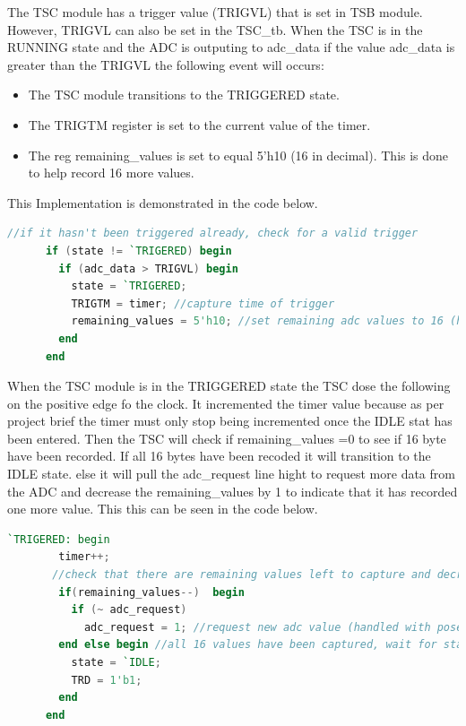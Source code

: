 The TSC module has a trigger value (TRIGVL) that is set in TSB module.
However, TRIGVL can also be set in the TSC\_tb.
When the TSC is in the RUNNING state and the ADC is outputing to adc\_data if the value adc\_data is
greater than the TRIGVL the following event will occurs:

\begin{itemize}
      \item The TSC module transitions to the TRIGGERED state.
      \item The TRIGTM register is set to the current value of the timer.
      \item  The reg remaining\_values is set to equal 5'h10 (16 in decimal). This is done to help record 16 more values.
\end{itemize}

This Implementation is demonstrated in the code below.

\begin{lstlisting}[language=Verilog, caption={Code for triggering event in the TSC module}, label={triggering}]
      //if it hasn't been triggered already, check for a valid trigger
      if (state != `TRIGERED) begin 
        if (adc_data > TRIGVL) begin
          state = `TRIGERED;
          TRIGTM = timer; //capture time of trigger
          remaining_values = 5'h10; //set remaining adc values to 16 (handled by posedge clk)
        end
      end
\end{lstlisting}


When the TSC module is in the TRIGGERED state the TSC dose the following on the positive edge fo the clock.
It incremented the timer value because as per project brief the timer must only stop being incremented once the IDLE stat has been entered.
Then the TSC will check if remaining\_values =0 to see if 16 byte have been recorded.
If all 16 bytes have been recoded it will transition to the IDLE state.
else it will pull the adc\_request line hight to request more data from the ADC and decrease the remaining\_values by 1 to
indicate that it has recorded one more value. This this can be seen in the code below.

\begin{lstlisting}[language=Verilog, caption={Code for triggering event in the TSC module}, label={triggering}]
      `TRIGERED: begin
        timer++;
       //check that there are remaining values left to capture and decrement.
        if(remaining_values--)  begin 
          if (~ adc_request)
            adc_request = 1; //request new adc value (handled with posedge adc_ready)
        end else begin //all 16 values have been captured, wait for start or SBF command
          state = `IDLE; 
          TRD = 1'b1;
        end
      end
\end{lstlisting}

